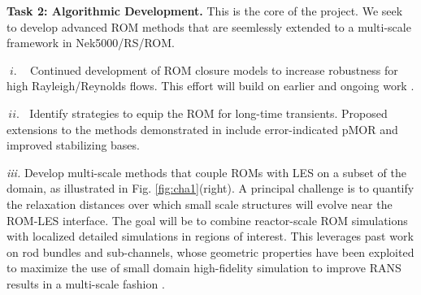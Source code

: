 

\noindent
\textbf{Task 2: Algorithmic Development.} This is the core of the project.
We seek to develop advanced ROM methods that are seemlessly
extended to a multi-scale framework in Nek5000/RS/ROM.
\\[-3ex]
\begin{description}
\item{$\; i. \; \; \;$}
Continued development of ROM closure models to increase robustness
for high Rayleigh/Reynolds flows.  This effort will build on earlier and
ongoing work
\cite{kaneko22a,kaneko22,tsai22a,kaneko20a,mou2021}.
\\[-3ex]
\item{$\, ii. \;\;$}
Identify strategies to equip the ROM for long-time transients.
Proposed extensions to the methods demonstrated in \cite{kaneko20a}
include error-indicated pMOR and improved stabilizing bases.
\\[-3ex]
\item{\em iii. \;}Develop multi-scale methods that couple ROMs with LES on a
subset of the domain, as illustrated in Fig. \ref{fig:cha1}(right).
A principal challenge is to quantify the relaxation distances over which small
scale structures will evolve near the ROM-LES interface. The goal will be to
combine reactor-scale ROM simulations with localized detailed simulations in
regions of interest. This leverages past work on rod bundles and sub-channels,
whose geometric properties have been exploited to maximize the use of small
domain high-fidelity simulation to improve RANS results in a multi-scale
fashion \cite{martinez2019a}.
\\[-2ex]
\end{description}%

